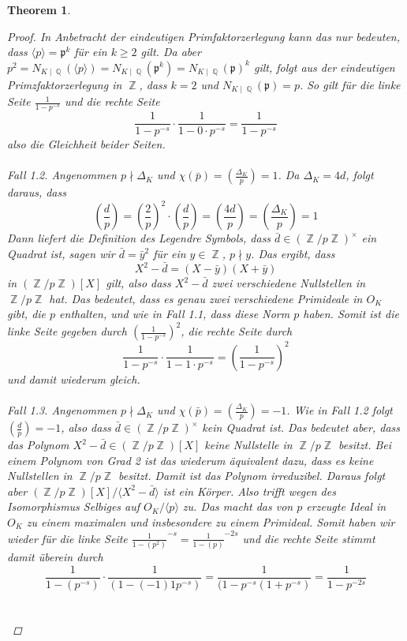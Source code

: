 \documentclass[10pt,a4paper]{article}
\theoremstyle{plain}
\newtheorem{thm}{Theorem}[section]
\theoremstyle{definition}
\theoremstyle{remark}
\DeclareMathOperator{\Q}{\mathbb{Q}}
\DeclareMathOperator{\Z}{\mathbb{Z}}
\begin{document}
\begin{thm}
\begin{proof}
In Anbetracht der eindeutigen Primfaktorzerlegung kann das nur bedeuten, dass $\langle p\rangle =\mathfrak{p}^k$ für ein $k\geq 2$ gilt. Da aber $p^2=N_{K\mid \Q}(\langle p\rangle)=N_{K\mid \Q}(\mathfrak{p}^k) =N_{K\mid \Q}(\mathfrak{p})^k $ gilt, folgt aus der eindeutigen Primzfaktorzerlegung in $\Z$, dass $k = 2$ und $N_{K\mid\Q}(\mathfrak{p}) =p$. So gilt für die linke Seite $\frac{1}{1-p^{-s}}$ und die rechte Seite $$\frac{1}{1-p^{-s}}\cdot \frac{1}{1-0\cdot p^{-s}}=\frac{1}{1-p^{-s}}$$also die Gleichheit beider Seiten.
\\
\\
\textit{Fall 1.2.}
Angenommen $p \nmid \Delta_K$ und $\chi(\bar{p})=(\frac{\Delta_K}{p})= 1$. Da $\Delta_K = 4d$, folgt daraus, dass $$(\frac{d}{p})=(\frac{2}{p})^2\cdot (\frac{d}{p})=(\frac{4d}{p})=(\frac{\Delta_K}{p})=1$$Dann liefert die Definition des Legendre Symbols, dass $\bar{d} \in (\Z/p\Z)^\times$ ein Quadrat ist, sagen wir $\bar{d}=\bar{y}^2$ für ein $y \in \Z$,  $p \nmid y$. Das ergibt, dass $$X^2-\bar{d}=(X-\bar{y})(X+\bar{y})$$ in $(\Z/p\Z)[X] $ gilt, also dass $X^2-\bar{d}$ zwei verschiedene Nullstellen in $\Z/p\Z$ hat. Das bedeutet, dass es genau zwei verschiedene Primideale in $O_K$ gibt, die $p$ enthalten, und wie in Fall 1.1, dass diese Norm $p$ haben. Somit ist die linke Seite gegeben durch $(\frac{1}{1-p^{-s}})^2$, die rechte Seite durch $$\frac{1}{1-p^{-s}}\cdot\frac{1}{1-1\cdot p^{-s}}=(\frac{1}{1-p^{-s}})^2$$ und damit wiederum gleich.
\\
\\
\textit{Fall 1.3.}
Angenommen $p \nmid \Delta_K$ und $\chi(\bar{p})=(\frac{\Delta_K}{p})= -1$. Wie in Fall 1.2 folgt $(\frac{d}{p})=-1$, also dass $\bar{d} \in (\Z/p\Z)^\times$ kein Quadrat ist. Das bedeutet aber, dass das Polynom $X^2-\bar{d} \in (\Z/p\Z)[X] $ keine Nullstelle in $\Z/p\Z$ besitzt. Bei einem Polynom von Grad 2 ist das wiederum äquivalent dazu, dass es keine Nullstellen in $\Z/p\Z$ besitzt. Damit ist das Polynom irreduzibel. Daraus folgt aber $(\Z/p\Z)[X]/\langle X^{2}-\bar{d}\rangle$ ist ein Körper. Also trifft wegen des Isomorphismus Selbiges auf $O_K/\langle p\rangle$ zu. Das macht das von $p$ erzeugte Ideal in $O_K$ zu einem maximalen und insbesondere zu einem Primideal. Somit haben wir wieder für die linke Seite $\frac{1}{1-(p^{2})}^{-s}=\frac{1}{1-(p)}^{-2s}$ und die rechte Seite stimmt damit überein durch $$\frac{1}{1-(p^{-s})}\cdot\frac{1}{(1-(-1)1p^{-s})}=\frac{1}{(1-p^{-s}(1+p^{-s})}=\frac{1}{1-p^{-2s}}$$
\\
\\

\end{proof}
\end{thm}
\end{document}

